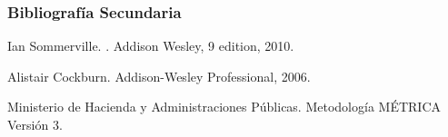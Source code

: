 \documentclass[animated,a4paper,slidestop,xcolor=pst,blue]{beamer}
\begin{document}
\begin{frame}[c]
    \frametitle{Bibliografía Secundaria}
    \begin{thebibliography}{1}
Ian Sommerville.
.
\newblock Addison Wesley, 9 edition, 2010.


Alistair Cockburn.
\newblock Addison-Wesley Professional, 2006.

\bibitem{}
Ministerio de Hacienda y Administraciones Públicas.
\newblock Metodología MÉTRICA Versión 3.

\end{thebibliography}
\end{frame}
\end{document}
